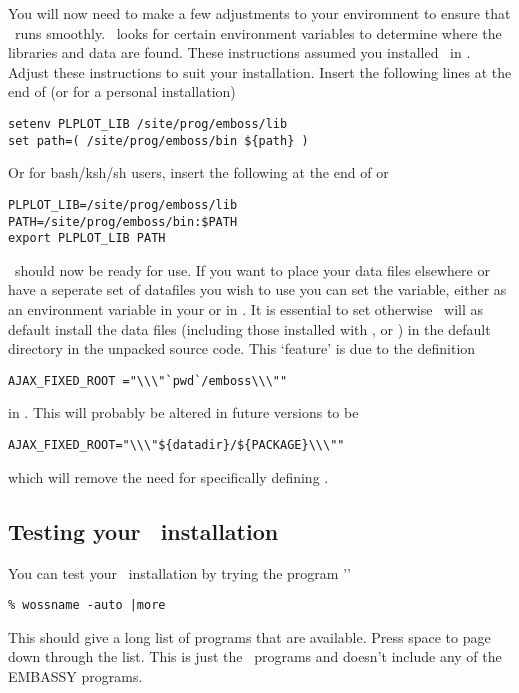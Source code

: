 \documentclass{report}
\begin{document}
You will now need to make a few adjustments to your enviromnent to ensure that \EMBOSS\ runs smoothly.
\EMBOSS\ looks for certain environment variables to determine where the libraries and data are found. These instructions assumed you installed \EMBOSS\ in . Adjust these instructions to suit your installation.
Insert the following lines at the end of  (or  for a personal installation)
\begin{verbatim}
setenv PLPLOT_LIB /site/prog/emboss/lib
set path=( /site/prog/emboss/bin ${path} )
\end{verbatim}
Or for bash/ksh/sh users, insert the following at the end of  or 
\begin{verbatim}
PLPLOT_LIB=/site/prog/emboss/lib
PATH=/site/prog/emboss/bin:$PATH
export PLPLOT_LIB PATH
\end{verbatim}

\EMBOSS\ should now be ready for use.
If you want to place your data files elsewhere or have a seperate set of 
datafiles you wish to use you can set the  variable, 
either as an environment variable in your  or in 
. It is essential to set  
otherwise \EMBOSS\ will as default install the data files (including those 
installed with ,  or 
) in the default directory  in 
the unpacked source code. This `feature' is due to the definition 
\begin{verbatim}
AJAX_FIXED_ROOT ="\\\"`pwd`/emboss\\\""
\end{verbatim} 
in . This will probably be altered in future versions to be
 \begin{verbatim}
AJAX_FIXED_ROOT="\\\"${datadir}/${PACKAGE}\\\""
\end{verbatim} 
which will remove the need for specifically defining .



\subsection{Testing your \EMBOSS\ installation}

You can test your \EMBOSS\ installation by trying the program ''
\begin{verbatim}
% wossname -auto |more
\end{verbatim}
This should give a long list of programs that are available. Press space to page down through the list. This is just the \EMBOSS\ programs and doesn't include any of the EMBASSY programs.
\end{document}
